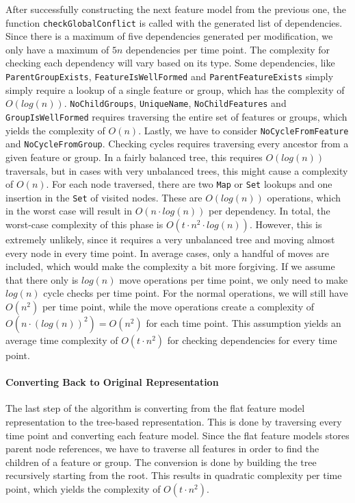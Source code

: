 \documentclass[a4paper,english]{ifimaster}
\begin{document}
After successfully constructing the next feature model from the previous one, the function \texttt{check\-Global\-Conflict} is called with the generated list of dependencies. Since there is a maximum of five dependencies generated per modification, we only have a maximum of $5n$ dependencies per time point. The complexity for checking each dependency will vary based on its type. Some dependencies, like \texttt{ParentGroupExists}, \texttt{FeatureIsWellFormed} and \texttt{ParentFeatureExists} simply simply require a lookup of a single feature or group, which has the complexity of $O(log(n))$. \texttt{NoChildGroups}, \texttt{UniqueName}, \texttt{NoChildFeatures} and \texttt{GroupIsWellFormed} requires traversing the entire set of features or groups, which yields the complexity of $O(n)$. Lastly, we have to consider \texttt{NoCycleFromFeature} and \texttt{NoCycleFromGroup}. Checking cycles requires traversing every ancestor from a given feature or group. In a fairly balanced tree, this requires $O(log(n))$ traversals, but in cases with very unbalanced trees, this might cause a complexity of $O(n)$. For each node traversed, there are two \texttt{Map} or \texttt{Set} lookups and one insertion in the \texttt{Set} of visited nodes. These are $O(log(n))$ operations, which in the worst case will result in $O(n \cdot log(n))$ per dependency. In total, the worst-case complexity of this phase is $O(t \cdot n^2  \cdot log(n))$. However, this is extremely unlikely, since it requires a very unbalanced tree and moving almost every node in every time point. In average cases, only a handful of moves are included, which would make the complexity a bit more forgiving. If we assume that there only is $log(n)$ move operations per time point, we only need to make $log(n)$ cycle checks per time point. For the normal operations, we will still have $O(n^2)$ per time point, while the move operations create a complexity of $O(n \cdot (log(n))^2) = O(n^2)$ for each time point. This assumption yields an average time complexity of $O(t \cdot n^2)$ for checking dependencies for every time point.

\paragraph{Converting Back to Original Representation}

The last step of the algorithm is converting from the flat feature model representation to the tree-based representation. This is done by traversing every time point and converting each feature model. Since the flat feature models stores parent node references, we have to traverse all features in order to find the children of a feature or group. The conversion is done by building the tree recursively starting from the root. This results in quadratic complexity per time point, which yields the complexity of $O(t \cdot n^2)$.
\end{document}
